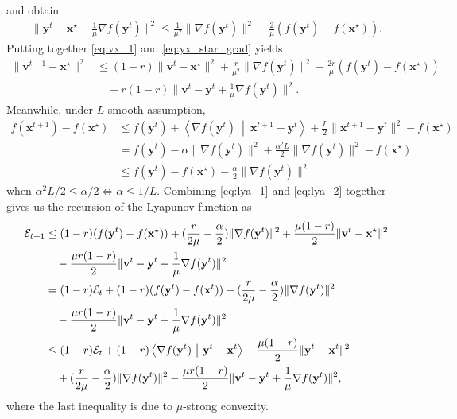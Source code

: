 \documentclass{article}
\theoremstyle{plain}
\theoremstyle{definition}
\theoremstyle{remark}
\def\bx{\mathbf{x}}
\def\by{\mathbf{y}}
\def\bv{\mathbf{v}}
\newcommand{\dotp}[2]{\left\langle{#1}\ \middle|\ {#2}\right\rangle}
\begin{document}
and obtain
\begin{align}
    \| \by^t - \bx^\star - \frac{1}{\mu} \nabla f(\by^t)\|^2 \leq \frac{1}{\mu^2} \|\nabla f(\by^t) \|^2 -\frac{2}{\mu}(f(\by^t)  - f(\bx^\star) ). \label{eq:yx_star_grad}
\end{align}
Putting together \eqref{eq:vx_1} and \eqref{eq:yx_star_grad} yields
\begin{align}
    \| \bv^{t+1} - \bx^\star \|^2  &\leq (1-r) \| \bv^t-\bx^\star \|^2 + \frac{r}{\mu^2} \|\nabla f(\by^t) \|^2 -\frac{2r}{\mu}(f(\by^t)  - f(\bx^\star) )\\
    &\quad - r(1-r) \| \bv^t - \by^t + \frac{1}{\mu} \nabla f(\by^t) \|^2. \label{eq:lya_1}
\end{align}
Meanwhile, under $L$-smooth assumption, 
\begin{align}
    f(\bx^{t+1}) - f(\bx^\star) &\leq f(\by^t) + \dotp{\nabla f(\by^t)}{\bx^{t+1} - \by^t} + \frac{L}{2} \| \bx^{t+1} -\by^t \|^2 -f(\bx^\star) \\
    &= f(\by^t) - \alpha \| \nabla f(\by^t) \|^2 + \frac{\alpha^2 L}{2} \| \nabla f(\by^t) \|^2 - f(\bx^\star) \\
    &\leq f(\by^t) -f(\bx^\star) - \frac{\alpha}{2} \| \nabla f(\by^t) \|^2 \label{eq:lya_2}
\end{align}
when $\alpha^2 L / 2 \leq \alpha / 2 \Leftrightarrow \alpha \leq 1/L$. Combining \eqref{eq:lya_1} and \eqref{eq:lya_2} together gives us the recursion of the Lyapunov function as
\begin{align}
    {\cal E}_{t+1} &\leq (1-r)(f(\by^t) -f(\bx^\star)) + (\frac{r}{2\mu} - \frac{\alpha}{2} )\| \nabla f(\by^t) \|^2 + \frac{\mu(1-r)}{2} \| \bv^t-\bx^\star \|^2 \\
    &\quad - \frac{\mu r(1-r)}{2} \| \bv^t - \by^t + \frac{1}{\mu} \nabla f(\by^t) \|^2 \\
    &= (1-r){\cal E}_t + (1-r)(f(\by^t) - f(\bx^t)) + (\frac{r}{2\mu} - \frac{\alpha}{2} )\| \nabla f(\by^t) \|^2\\
    &\quad - \frac{\mu r(1-r)}{2} \| \bv^t - \by^t + \frac{1}{\mu} \nabla f(\by^t) \|^2 \\
    &\leq (1-r){\cal E}_t + (1-r)\dotp{\nabla f(\by^t)}{\by^t - \bx^t} - \frac{\mu (1-r)}{2} \| \by^t - \bx^t\|^2\\
    &\quad  + (\frac{r}{2\mu} - \frac{\alpha}{2} )\| \nabla f(\by^t) \|^2  - \frac{\mu r(1-r)}{2} \| \bv^t - \by^t + \frac{1}{\mu} \nabla f(\by^t) \|^2 ,
\end{align}
where the last inequality is due to $\mu$-strong convexity.
\end{document}
